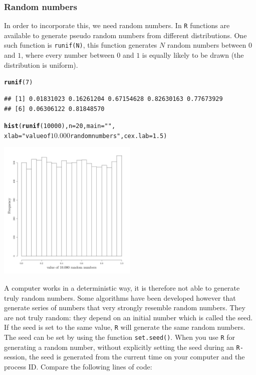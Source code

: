 \documentclass{article}\usepackage[]{graphicx}\usepackage[]{color}
\makeatletter
\newcommand{\hlnum}[1]{\textcolor[rgb]{0.686,0.059,0.569}{#1}}%
\newcommand{\hlstr}[1]{\textcolor[rgb]{0.192,0.494,0.8}{#1}}%
\newcommand{\hlstd}[1]{\textcolor[rgb]{0.345,0.345,0.345}{#1}}%
\newcommand{\hlkwc}[1]{\textcolor[rgb]{0.333,0.667,0.333}{#1}}%
\newcommand{\hlkwd}[1]{\textcolor[rgb]{0.737,0.353,0.396}{\textbf{#1}}}%
\newenvironment{kframe}{%
 \def\at@end@of@kframe{}%
 \ifinner\ifhmode%
  \def\at@end@of@kframe{\end{minipage}}%
  \begin{minipage}{\columnwidth}%
 \fi\fi%
 \def\FrameCommand##1{\hskip\@totalleftmargin \hskip-\fboxsep
 \colorbox{shadecolor}{##1}\hskip-\fboxsep
     \hskip-\linewidth \hskip-\@totalleftmargin \hskip\columnwidth}%
 \MakeFramed {\advance\hsize-\width
   \@totalleftmargin\z@ \linewidth\hsize
   \@setminipage}}%
 {\par\unskip\endMakeFramed%
 \at@end@of@kframe}
\newenvironment{knitrout}{}{} %
\makeatother
\begin{document}
\subsubsection{Random numbers}
In order to incorporate this, we need random numbers. In \texttt{R} functions are available to generate pseudo random numbers from different distributions. One such function is \texttt{runif(N)}, this function generates $N$ random numbers between $0$ and $1$, where every number between $0$ and $1$ is equally likely to be drawn (the distribution is uniform).
\begin{knitrout}
\color{fgcolor}\begin{kframe}
\begin{alltt}
\hlkwd{runif}\hlstd{(}\hlnum{7}\hlstd{)}
\end{alltt}
\begin{verbatim}
## [1] 0.01831023 0.16261204 0.67154628 0.82630163 0.77673929
## [6] 0.06306122 0.81848570
\end{verbatim}
\begin{alltt}
\hlkwd{hist}\hlstd{(}\hlkwd{runif}\hlstd{(}\hlnum{10000}\hlstd{),}\hlkwc{n}\hlstd{=}\hlnum{20}\hlstd{,}\hlkwc{main}\hlstd{=}\hlstr{""}\hlstd{,}
     \hlkwc{xlab}\hlstd{=}\hlstr{"value of $10.000$ random numbers"}\hlstd{,} \hlkwc{cex.lab}\hlstd{=}\hlnum{1.5}\hlstd{)}
\end{alltt}
\end{kframe}

{\centering \includegraphics[width=0.5\textwidth]{figure/k19-1} 

}



\end{knitrout}
A computer works in a deterministic way, it is therefore not able to generate truly random numbers. Some algorithms have been developed however that generate series of numbers that very strongly resemble random numbers. They are not truly random: they depend on an initial number which is called the seed. If the seed is set to the same value, \texttt{R} will generate the same random numbers. The seed can be set by using the function \texttt{set.seed()}. When you use \texttt{R} for generating a random number, without explicitly setting the seed during an \texttt{R-}session, the seed is generated from the current time on your computer and the process ID. Compare the following lines of code:
\end{document}

